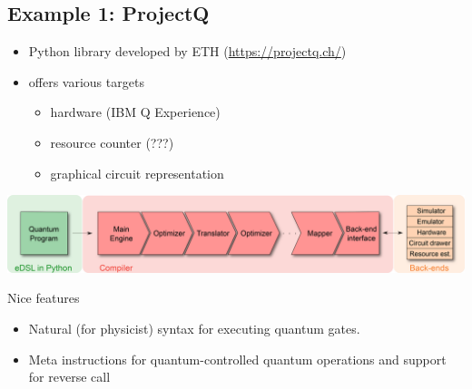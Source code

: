 \documentclass{beamer}
\begin{document}
\subsection{Example 1: ProjectQ}

\begin{frame}{\insertsection}{\insertsubsection}
	\begin{itemize}
        \item Python library developed by ETH (\url{https://projectq.ch/})
        \item offers various targets
        \begin{itemize}
            \item hardware (IBM Q Experience) 
            \item resource counter (???)
            \item graphical circuit representation
        \end{itemize}
    \end{itemize}
\end{frame}


\begin{frame}{\insertsection}{\insertsubsection}
\includegraphics[width=\textwidth]{pics/projectq-compiler-overview.png}\\

\end{frame}

\begin{frame}{\insertsection}{\insertsubsection}
    Nice features
    \begin{itemize}
        \item Natural (for physicist) syntax for executing quantum gates.
        \item Meta instructions for quantum-controlled quantum operations and 
        support for reverse call
    \end{itemize}
\end{frame}
\end{document}
